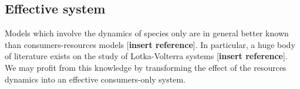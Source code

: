 \documentclass[12pt]{report}
\begin{document}
\subsection{Effective system}
Models which involve the dynamics of species only are in general better known than consumers-resources models [\textbf{insert reference}]. In particular, a huge body of literature exists on the study of Lotka-Volterra systems [\textbf{insert reference}]. We may profit from this knowledge by transforming the effect of the resources dynamics into an effective consumers-only system.
\end{document}
